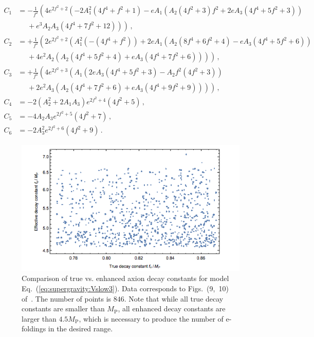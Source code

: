 \documentclass[12pt]{article}
\begin{document}
\begin{equation} \label{eq:supergravity:Vslow3Coefficients}
  \begin{aligned}
    C_1 &= -\frac{1}{f^2} \left(4 e^{2 f^2 + 2} \left(
      - 2 A_1^2 \left(4 f^4 + f^2 + 1\right)
      - e A_1 \left(A_2 \left(4 f^2 + 3\right) f^2
      + 2 e A_3 \left(4 f^4 + 5 f^2 + 3\right)\right)\right.\right.\\
      &~~~~~~ \left.\left.{} + e^3 A_2 A_3 \left(4 f^4 + 7 f^2 + 12\right)
    \right)\right)\,,\\
    C_2 &= +\frac{1}{f^2} \left(2 e^{2 f^2 + 2} \left(
        A_1^2 \left(-\left(4 f^4 + f^2\right)\right)
      + 2 e A_1 \left(
          A_2 \left(8 f^4 + 6 f^2 + 4\right)
        - e A_3 \left(4 f^4 + 5 f^2 + 6\right)
      \right)\right.\right.\\
      &~~~~~~ \left.\left.{} + 4 e^2 A_2 \left(
          A_2 \left(4 f^4 + 5 f^2 + 4\right)
        + e A_3 \left(4 f^4 + 7 f^2 + 6\right)
      \right)\right)\right)\,,\\
    C_3 &= +\frac{1}{f^2}\left(4 e^{2 f^2 + 3} \left(
      A_1 \left(
          2 e A_3 \left(4 f^4 + 5 f^2 + 3\right)
        - A_2 f^2 \left(4 f^2 + 3\right)
      \right)\right.\right.\\
      &~~~~~~ \left.\left.{} + 2 e^2 A_3 \left(
          A_2 \left(4 f^4 + 7 f^2 + 6\right)
        + e A_3 \left(4 f^4 + 9 f^2 + 9\right)
      \right)\right)\right)\,,\\
    C_4 &= -2 \left(A_2^2 + 2 A_1 A_3\right) e^{2 f^2 + 4} \left(4 f^2 + 5\right)\,,\\
    C_5 &= -4 A_2 A_3 e^{2 f^2 + 5} \left(4 f^2 + 7 \right)\,,\\
    C_6 &= -2 A_3^2 e^{2 f^2 + 6} \left(4 f^2 + 9\right)\,.
  \end{aligned}
\end{equation}

\begin{figure} \label{fig:supergravity} %
  \centering
  \includegraphics[width = 0.8 \textwidth]{figs/figsugra.png}
  \caption{Comparison of true vs. enhanced axion decay constants for model Eq.~(\ref{eq:supergravity:Vslow3}).
    Data corresponds to Figs.~(9,~10) of~\cite{Nath:2017ihp}.
    The number of points is $846$.
    Note that while all true decay constants are smaller than $M_\text{P}$, all enhanced decay constants are larger than $4.5 M_\text{P}$, which is necessary to produce the number of e-foldings in the desired range.}
\end{figure}
\end{document}
